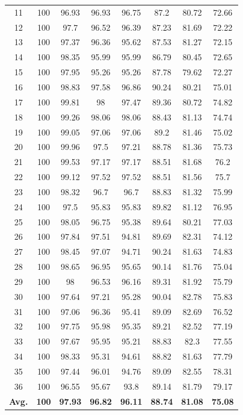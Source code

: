 \documentclass[review]{elsarticle}
\begin{document}
\begin{table}[ht!]
\begin{minipage}{0.48\linewidth}
{\begin{tabular}{c|ccccccc}
				11&100&96.93&96.93&96.75&87.2&80.72&72.66\\
				12&100&97.7&96.52&96.39&87.23&81.69&72.22\\
				13&100&97.37&96.36&95.62&87.53&81.27&72.15\\
				14&100&98.35&95.99&95.99&86.79&80.45&72.65\\
				15&100&97.95&95.26&95.26&87.78&79.62&72.27\\
				16&100&98.83&97.58&96.86&90.24&80.21&75.01\\
				17&100&99.81&98&97.47&89.36&80.72&74.82\\
				18&100&99.26&98.06&98.06&88.43&81.13&74.74\\
				19&100&99.05&97.06&97.06&89.2&81.46&75.02\\
				20&100&99.96&97.5&97.21&88.78&81.36&75.73\\
				21&100&99.53&97.17&97.17&88.51&81.68&76.2\\
				22&100&99.12&97.52&97.52&88.51&81.56&75.7\\
				23&100&98.32&96.7&96.7&88.83&81.32&75.99\\
				24&100&97.5&95.83&95.83&89.82&81.12&76.95\\
				25&100&98.05&96.75&95.38&89.64&80.21&77.03\\
				26&100&97.84&97.51&94.81&89.69&82.31&74.12\\
				27&100&98.45&97.07&94.71&90.24&81.63&74.83\\
				28&100&98.65&96.95&95.65&90.14&81.76&75.04\\
				29&100&98&96.53&96.16&89.31&81.92&75.79\\
				30&100&97.64&97.21&95.28&90.04&82.78&75.83\\
				31&100&97.06&96.36&95.41&89.09&82.69&76.52\\
				32&100&97.75&95.98&95.35&89.21&82.52&77.19\\
				33&100&97.67&95.95&95.21&88.83&82.3&77.55\\
				34&100&98.33&95.31&94.61&88.82&81.63&77.79\\
				35&100&97.44&96.01&94.76&89.09&82.55&78.31\\
				36&100&96.55&95.67&93.8&89.14&81.79&79.17\\
				\hline
				\textbf{Avg.}&\textbf{100}&\textbf{97.93}&\textbf{96.82}&\textbf{96.11}&\textbf{88.74}&\textbf{81.08}&\textbf{75.08}\\
				\hline\hline	
		\end{tabular}}
	\end{minipage}
\end{table}
\end{document}
